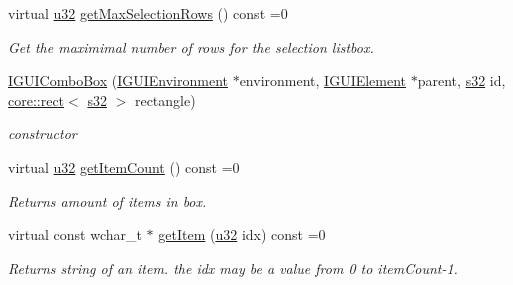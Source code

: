 \begin{DoxyCompactItemize}
\mbox{\label{classirr_1_1gui_1_1IGUIComboBox_afc75706835598a9016ce8a8f020c690c}} 
virtual \hyperlink{namespaceirr_a0416a53257075833e7002efd0a18e804}{u32} \hyperlink{classirr_1_1gui_1_1IGUIComboBox_afc75706835598a9016ce8a8f020c690c}{get\+Max\+Selection\+Rows} () const =0
\begin{DoxyCompactList}\small\item\em Get the maximimal number of rows for the selection listbox. \end{DoxyCompactList}\item 
\mbox{\label{classirr_1_1gui_1_1IGUIComboBox_a89e96a8ac4c47e7b202be120486f1f94}} 
\hyperlink{classirr_1_1gui_1_1IGUIComboBox_a89e96a8ac4c47e7b202be120486f1f94}{I\+G\+U\+I\+Combo\+Box} (\hyperlink{classirr_1_1gui_1_1IGUIEnvironment}{I\+G\+U\+I\+Environment} $\ast$environment, \hyperlink{classirr_1_1gui_1_1IGUIElement}{I\+G\+U\+I\+Element} $\ast$parent, \hyperlink{namespaceirr_ac66849b7a6ed16e30ebede579f9b47c6}{s32} id, \hyperlink{classirr_1_1core_1_1rect}{core\+::rect}$<$ \hyperlink{namespaceirr_ac66849b7a6ed16e30ebede579f9b47c6}{s32} $>$ rectangle)
\begin{DoxyCompactList}\small\item\em constructor \end{DoxyCompactList}\item 
\mbox{\label{classirr_1_1gui_1_1IGUIComboBox_a573bdf5507fd9d389635cbb4d84c3757}} 
virtual \hyperlink{namespaceirr_a0416a53257075833e7002efd0a18e804}{u32} \hyperlink{classirr_1_1gui_1_1IGUIComboBox_a573bdf5507fd9d389635cbb4d84c3757}{get\+Item\+Count} () const =0
\begin{DoxyCompactList}\small\item\em Returns amount of items in box. \end{DoxyCompactList}\item 
\mbox{\label{classirr_1_1gui_1_1IGUIComboBox_afe60f75b5e8685f6a19101d31ad6d369}} 
virtual const wchar\+\_\+t $\ast$ \hyperlink{classirr_1_1gui_1_1IGUIComboBox_afe60f75b5e8685f6a19101d31ad6d369}{get\+Item} (\hyperlink{namespaceirr_a0416a53257075833e7002efd0a18e804}{u32} idx) const =0
\begin{DoxyCompactList}\small\item\em Returns string of an item. the idx may be a value from 0 to item\+Count-\/1. \end{DoxyCompactList}\item 

\end{DoxyCompactItemize}
